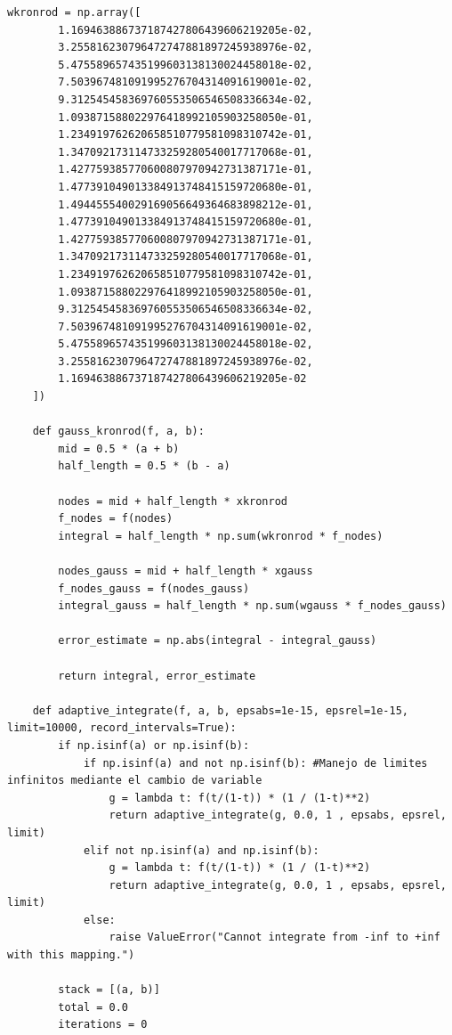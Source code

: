 \documentclass{article}
\begin{document}
\begin{lstlisting}[caption={Implementación de la integración adaptativa con cuadratura Gauss-Kronrod}]
    wkronrod = np.array([
        1.169463886737187427806439606219205e-02,
        3.255816230796472747881897245938976e-02,
        5.475589657435199603138130024458018e-02,
        7.503967481091995276704314091619001e-02,
        9.312545458369760553506546508336634e-02,
        1.093871588022976418992105903258050e-01,
        1.234919762620658510779581098310742e-01,
        1.347092173114733259280540017717068e-01,
        1.427759385770600807970942731387171e-01,
        1.477391049013384913748415159720680e-01,
        1.494455540029169056649364683898212e-01,
        1.477391049013384913748415159720680e-01,
        1.427759385770600807970942731387171e-01,
        1.347092173114733259280540017717068e-01,
        1.234919762620658510779581098310742e-01,
        1.093871588022976418992105903258050e-01,
        9.312545458369760553506546508336634e-02,
        7.503967481091995276704314091619001e-02,
        5.475589657435199603138130024458018e-02,
        3.255816230796472747881897245938976e-02,
        1.169463886737187427806439606219205e-02
    ])
        
    def gauss_kronrod(f, a, b):
        mid = 0.5 * (a + b)
        half_length = 0.5 * (b - a)
    
        nodes = mid + half_length * xkronrod
        f_nodes = f(nodes)
        integral = half_length * np.sum(wkronrod * f_nodes)
    
        nodes_gauss = mid + half_length * xgauss
        f_nodes_gauss = f(nodes_gauss)
        integral_gauss = half_length * np.sum(wgauss * f_nodes_gauss)
    
        error_estimate = np.abs(integral - integral_gauss)
    
        return integral, error_estimate
    
    def adaptive_integrate(f, a, b, epsabs=1e-15, epsrel=1e-15, limit=10000, record_intervals=True):
        if np.isinf(a) or np.isinf(b):
            if np.isinf(a) and not np.isinf(b): #Manejo de limites infinitos mediante el cambio de variable
                g = lambda t: f(t/(1-t)) * (1 / (1-t)**2)
                return adaptive_integrate(g, 0.0, 1 , epsabs, epsrel, limit)
            elif not np.isinf(a) and np.isinf(b):
                g = lambda t: f(t/(1-t)) * (1 / (1-t)**2)
                return adaptive_integrate(g, 0.0, 1 , epsabs, epsrel, limit)
            else:
                raise ValueError("Cannot integrate from -inf to +inf with this mapping.")
    
        stack = [(a, b)]
        total = 0.0
        iterations = 0
        

\end{lstlisting}
\end{document}
